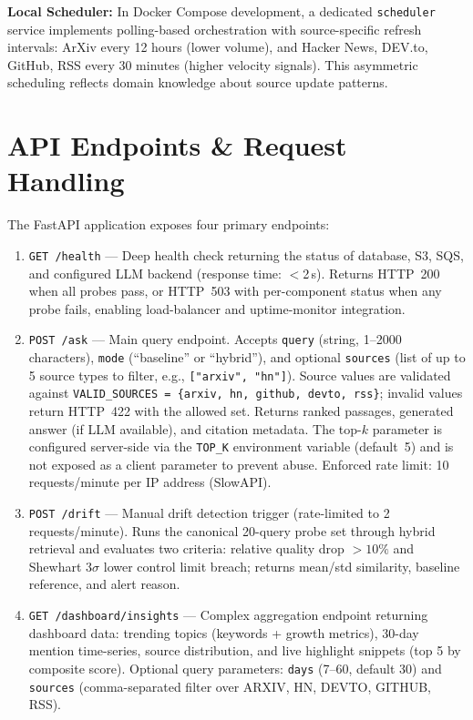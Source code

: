 \noindent\textbf{Local Scheduler:} In Docker Compose development, a dedicated \texttt{scheduler} service implements polling-based orchestration with source-specific refresh intervals: ArXiv every 12 hours (lower volume), and Hacker News, DEV.to, GitHub, RSS every 30 minutes (higher velocity signals). This asymmetric scheduling reflects domain knowledge about source update patterns.

\section{API Endpoints \& Request Handling}
\label{sec:api_endpoints}

The FastAPI application exposes four primary endpoints:

\begin{enumerate}[leftmargin=0.5in]
  \item \texttt{GET /health} --- Deep health check returning the status of database, S3, SQS, and configured LLM backend (response time: $<$2\,s). Returns HTTP~200 when all probes pass, or HTTP~503 with per-component status when any probe fails, enabling load-balancer and uptime-monitor integration.
  
  \item \texttt{POST /ask} --- Main query endpoint. Accepts \texttt{query} (string, 1--2000 characters), \texttt{mode} (``baseline'' or ``hybrid''), and optional \texttt{sources} (list of up to 5 source types to filter, e.g., \texttt{["arxiv", "hn"]}). Source values are validated against \texttt{VALID\_SOURCES = \{arxiv, hn, github, devto, rss\}}; invalid values return HTTP~422 with the allowed set. Returns ranked passages, generated answer (if LLM available), and citation metadata. The top-$k$ parameter is configured server-side via the \texttt{TOP\_K} environment variable (default~5) and is not exposed as a client parameter to prevent abuse. Enforced rate limit: 10 requests/minute per IP address (SlowAPI).
  
  \item \texttt{POST /drift} --- Manual drift detection trigger (rate-limited to 2 requests/minute). Runs the canonical 20-query probe set through hybrid retrieval and evaluates two criteria: relative quality drop $> 10\%$ and Shewhart $3\sigma$ lower control limit breach; returns mean/std similarity, baseline reference, and alert reason.
  
  \item \texttt{GET /dashboard/insights} --- Complex aggregation endpoint returning dashboard data: trending topics (keywords + growth metrics), 30-day mention time-series, source distribution, and live highlight snippets (top 5 by composite score). Optional query parameters: \texttt{days} (7--60, default 30) and \texttt{sources} (comma-separated filter over ARXIV, HN, DEVTO, GITHUB, RSS).
\end{enumerate}

